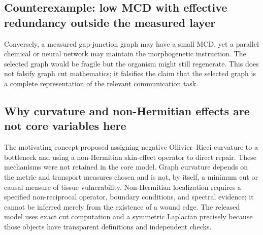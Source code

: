 \documentclass[12pt,a4paper]{article}
\begin{document}
\subsection{Counterexample: low MCD with effective redundancy outside the measured layer}
Conversely, a measured gap-junction graph may have a small MCD, yet a parallel chemical or neural network may maintain the morphogenetic instruction. The selected graph would be fragile but the organism might still regenerate. This does not falsify graph cut mathematics; it falsifies the claim that the selected graph is a complete representation of the relevant communication task.

\subsection{Why curvature and non-Hermitian effects are not core variables here}
The motivating concept proposed assigning negative Ollivier--Ricci curvature to a bottleneck and using a non-Hermitian skin-effect operator to direct repair. These mechanisms were not retained in the core model. Graph curvature depends on the metric and transport measures chosen and is not, by itself, a minimum cut or causal measure of tissue vulnerability. Non-Hermitian localization requires a specified non-reciprocal operator, boundary conditions, and spectral evidence; it cannot be inferred merely from the existence of a wound edge. The released model uses exact cut computation and a symmetric Laplacian precisely because those objects have transparent definitions and independent checks.
\end{document}
